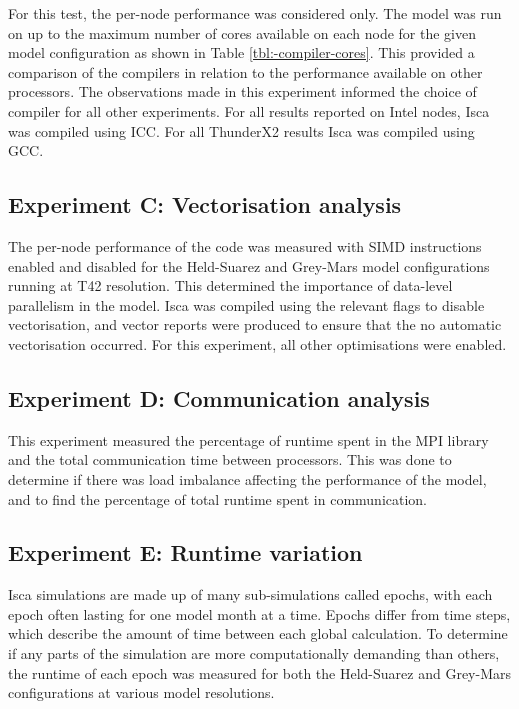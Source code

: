 \documentclass[a4paper,11pt]{report}
\begin{document}
\par

For this test, the per-node performance was considered only. The model was run on up to the maximum number of cores available on each node for the given model configuration as shown in Table \ref{tbl:-compiler-cores}. This provided a comparison of the compilers in relation to the performance available on other processors. The observations made in this experiment informed the choice of compiler for all other experiments. For all results reported on Intel nodes, Isca was compiled using ICC. For all ThunderX2 results Isca was compiled using GCC.

\subsection{Experiment C: Vectorisation analysis}
The per-node performance of the code was measured with SIMD instructions enabled and disabled for the Held-Suarez and Grey-Mars model configurations running at T42 resolution. This determined the importance of data-level parallelism in the model. Isca was compiled using the relevant flags to disable vectorisation, and vector reports were produced to ensure that the no automatic vectorisation occurred. For this experiment, all other optimisations were enabled.

\subsection{Experiment D: Communication analysis}
This experiment measured the percentage of runtime spent in the MPI library and the total communication time between processors. This was done to determine if there was load imbalance affecting the performance of the model, and to find the percentage of total runtime spent in communication. 
	
\subsection{Experiment E: Runtime variation}
Isca simulations are made up of many sub-simulations called epochs, with each epoch often lasting for one model month at a time. Epochs differ from time steps, which describe the amount of time between each global calculation. To determine if any parts of the simulation are more computationally demanding than others, the runtime of each epoch was measured for both the Held-Suarez and Grey-Mars configurations at various model resolutions.
\end{document}
